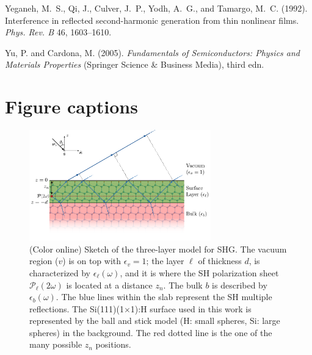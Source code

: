 \documentclass[utf8]{frontiersSCNS}
\begin{document}
\begin{thebibliography}{40}
Yeganeh, M.~S., Qi, J., Culver, J.~P., Yodh, A.~G., and Tamargo, M.~C. (1992).
\newblock Interference in reflected second-harmonic generation from thin
  nonlinear films.
\newblock \emph{Phys. Rev. B} 46, 1603--1610.
\newblock {}

Yu, P. and Cardona, M. (2005).
\newblock \emph{Fundamentals of {Semiconductors}: {Physics} and {Materials}
  {Properties}} (Springer Science \& Business Media), third edn.

\end{thebibliography}




\section*{Figure captions}

\begin{figure}[b]
\centering 
\includegraphics[width=0.7\textwidth]{figures/fig1}
\caption{(Color online) Sketch of the three-layer model for SHG. The vacuum
region ($v$) is on top with $\epsilon_{v}=1$; the layer $\ell$ of thickness $d$,
is characterized by $\epsilon_{\ell}(\omega)$, and it is where the SH
polarization sheet $\boldsymbol{\mathcal{P}}_{\ell}(2\omega)$ is located at a
distance $z_{n}$. The bulk $b$ is described by $\epsilon_{b}(\omega)$. The blue
lines within the slab represent the SH multiple reflections. The
Si(111)(1$\times$1):H surface used in this work is represented by the ball and
stick model (H: small spheres, Si: large spheres) in the background. The red
dotted line is the one of the many possible $z_{n}$ positions.}
\label{fig:MR3layer2w}
\end{figure}
\end{document}
